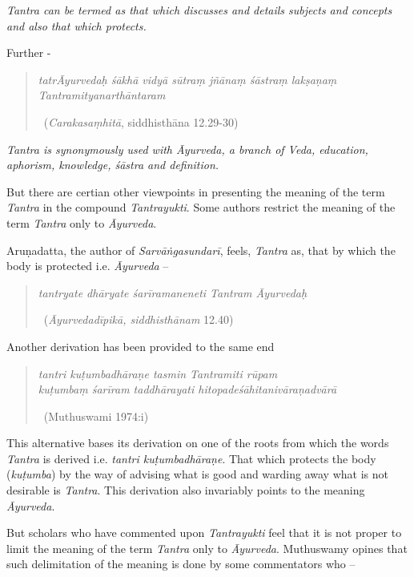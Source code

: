 \textit{Tantra can be termed as that which discusses and details subjects and concepts and also that which protects.}

Further -

\begin{verse}
\textit{tatrĀyurvedaḥ śākhā vidyā sūtraṃ jñānaṃ śāstraṃ lakṣaṇaṃ Tantramityanarthāntaram}

~\hfill (\textit{Carakasaṃhitā}, siddhisthāna 12.29-30)
\end{verse}

\textit{Tantra is synonymously used with Āyurveda, a branch of Veda, education, aphorism, knowledge, śāstra and definition.}

But there are certian other viewpoints in presenting the meaning of the term \textit{Tantra} in the compound \textit{Tantrayukti}. Some authors restrict the meaning of the term \textit{Tantra} only to \textit{Āyurveda}.

Aruṇadatta, the author of \textit{Sarvāṅgasundarī}, feels, \textit{Tantra} as, that by which the body is protected i.e. \textit{Āyurveda} –

\begin{verse}
\textit{tantryate dhāryate śarīramaneneti Tantram Āyurvedaḥ}

~\hfill (\textit{Āyurvedadīpikā, siddhisthānam} 12.40)
\end{verse}

Another derivation has been provided to the same end

\begin{verse}
\textit{tantri kuṭumbadhāraṇe tasmin Tantramiti rūpam}\\\textit{kuṭumbaṃ śarīram taddhārayati hitopadeśāhitanivāraṇadvārā}

~\hfill (Muthuswami 1974:i)
\end{verse}

This alternative bases its derivation on one of the roots from which the words \textit{Tantra} is derived i.e. \textit{tantri kuṭumbadhāraṇe}. That which protects the body (\textit{kuṭumba}) by the way of advising what is good and warding away what is not desirable is \textit{Tantra}. This derivation also invariably points to the meaning \textit{Āyurveda}.

But scholars who have commented upon \textit{Tantrayukti} feel that it is not proper to limit the meaning of the term \textit{Tantra} only to \textit{Āyurveda}. Muthuswamy opines that such delimitation of the meaning is done by some commentators who –

